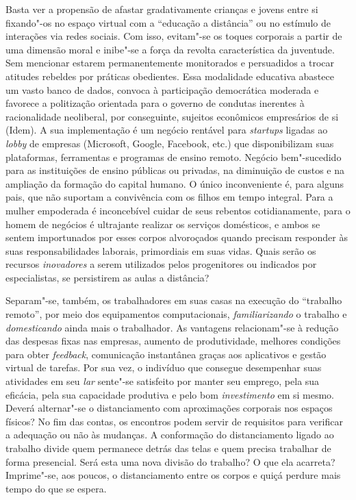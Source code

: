 Basta ver a propensão de afastar gradativamente crianças e jovens entre
si fixando"-os no espaço virtual com a ``educação a distância'' ou no
estímulo de interações via redes sociais. Com isso, evitam"-se os toques
corporais a partir de uma dimensão moral e inibe"-se a força da revolta
característica da juventude. Sem mencionar estarem permanentemente
monitorados e persuadidos a trocar atitudes rebeldes por práticas
obedientes. Essa modalidade educativa abastece um vasto banco de dados,
convoca à participação democrática moderada e favorece a politização
orientada para o governo de condutas inerentes à racionalidade
neoliberal, por conseguinte, sujeitos econômicos empresários de si
(Idem). A sua implementação é um negócio rentável para \emph{startups}
ligadas ao \emph{lobby} de empresas (Microsoft, Google, Facebook, etc.)
que disponibilizam suas plataformas, ferramentas e programas de ensino
remoto. Negócio bem"-sucedido para as instituições de ensino públicas ou
privadas, na diminuição de custos e na ampliação da formação do capital
humano. O único inconveniente é, para alguns pais, que não suportam a
convivência com os filhos em tempo integral. Para a mulher empoderada é
inconcebível cuidar de seus rebentos cotidianamente, para o homem de
negócios é ultrajante realizar os serviços domésticos, e ambos se sentem
importunados por esses corpos alvoroçados quando precisam responder às
suas responsabilidades laborais, primordiais em suas vidas. Quais serão
os recursos \emph{inovadores} a serem utilizados pelos progenitores ou
indicados por especialistas, se persistirem as aulas a distância?

Separam"-se, também, os trabalhadores em suas casas na execução do
``trabalho remoto'', por meio dos equipamentos computacionais,
\emph{familiarizando} o trabalho e \emph{domesticando} ainda mais o
trabalhador. As vantagens relacionam"-se à redução das despesas fixas nas
empresas, aumento de produtividade, melhores condições para obter
\emph{feedback}, comunicação instantânea graças aos aplicativos e gestão
virtual de tarefas. Por sua vez, o indivíduo que consegue desempenhar
suas atividades em seu \emph{lar} sente"-se satisfeito por manter seu
emprego, pela sua eficácia, pela sua capacidade produtiva e pelo bom
\emph{investimento} em si mesmo. Deverá alternar"-se o distanciamento com
aproximações corporais nos espaços físicos? No fim das contas, os
encontros podem servir de requisitos para verificar a adequação ou não
às mudanças. A conformação do distanciamento ligado ao trabalho divide
quem permanece detrás das telas e quem precisa trabalhar de forma
presencial. Será esta uma nova divisão do trabalho? O que ela acarreta?
Imprime"-se, aos poucos, o distanciamento entre os corpos e quiçá perdure
mais tempo do que se espera.

